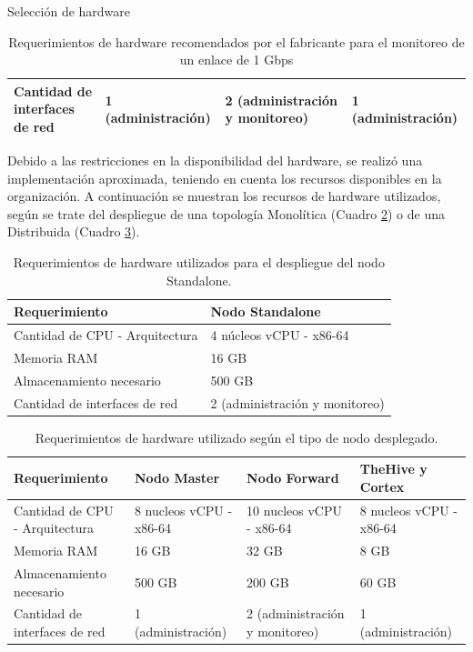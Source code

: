 \begin{subsection}{Selección de hardware}
\begin{table}[H]
\begin{tabular}{|m{9em}|m{9em}|m{9em}|m{9em}|}
    \hline
    Cantidad de interfaces de red & 1 (administración) & 2 (administración y monitoreo) & 1 (administración) \\
    \hline %
    \end{tabular}
    \caption{Requerimientos de hardware recomendados por el fabricante para el monitoreo de un enlace de 1 Gbps}
    \label{table:5}
    \end{table}
    Debido a las restricciones en la disponibilidad del hardware, se realizó una implementación aproximada, teniendo en cuenta los recursos disponibles en la organización. A continuación se muestran los recursos de hardware utilizados, según se trate del despliegue de una topología Monolítica (Cuadro \ref{table:16}) o de una Distribuida (Cuadro \ref{table:12}). \par
    \begin{table}[H]
    \centering
    \begin{tabular}{|m{10em}|m{10em}|}
    \hline 
    Requerimiento  & Nodo Standalone \\ 
    \hline
    Cantidad de CPU - Arquitectura &  4 núcleos vCPU - x86-64  \\ 
    \hline
    Memoria RAM  &  16 GB  \\ 
    \hline
    Almacenamiento necesario   & 500 GB  \\
    \hline
    Cantidad de interfaces de red  & 2 (administración y monitoreo) \\
    \hline %
    \end{tabular}
    \caption{Requerimientos de hardware utilizados para el despliegue del nodo Standalone.}
    \label{table:16}
   \end{table}
    \begin{table}[H]
    \centering
    \begin{tabular}{|m{9em}|m{9em}|m{9em}|m{9em}|}
    \hline 
    Requerimiento  & Nodo Master &  Nodo Forward & TheHive y Cortex \\ 
    \hline
     Cantidad de CPU - Arquitectura & 8 nucleos vCPU - x86-64 & 10 nucleos vCPU - x86-64 & 8 nucleos vCPU - x86-64 \\ 
    \hline
    Memoria RAM  & 16 GB & 32 GB & 8 GB \\ 
    \hline
    Almacenamiento necesario & 500 GB  & 200 GB & 60 GB \\
    \hline
    Cantidad de interfaces de red & 1 (administración) & 2 (administración y monitoreo) & 1 (administración) \\
    \hline %
    \end{tabular}
    \caption{Requerimientos de hardware utilizado según el tipo de nodo desplegado.}
    \label{table:12}
    \end{table}
    \end{subsection}
